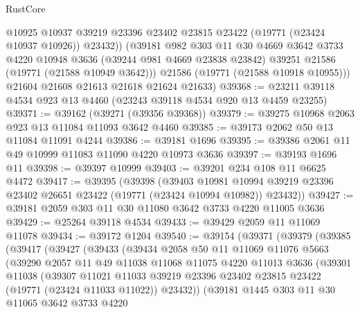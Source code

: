 \begin{lexlean}{RustCore}
\begin{coremodule}
            @10925
            @10937
            @39219
            @23396
            @23402
            @23815
            @23422
            (@19771 (@23424 @10937 @10926))
            @23432))
        (@39181
          @982
          @303
          @11
          @30
          @4669
          @3642
          @3733
          @4220
          @10948
          @3636
          (@39244 @981 @4669 @23838 @23842)
          @39251
          @21586
          (@19771 (@21588 @10949 @3642)))
        @21586
        (@19771 (@21588 @10918 @10955)))
      @21604
      @21608
      @21613
      @21618
      @21624
      @21633)
@39368 := @23211 @39118 @4534 @923 @13 @4460 (@23243 @39118 @4534 @920 @13 @4459 @23255)
@39371 := @39162 (@39271 (@39356 @39368))
@39379 := @39275 @10968 @2063 @923 @13 @11084 @11093 @3642 @4460
@39385 := @39173 @2062 @50 @13 @11084 @11091 @4244
@39386 := @39181 @1696
@39395 := @39386 @2061 @11 @49 @10999 @11083 @11090 @4220 @10973 @3636
@39397 := @39193 @1696 @11
@39398 := @39397 @10999
@39403 := @39201 @234 @108 @11 @6625 @4472
@39417 := @39395
    (@39398
      (@39403
        @10981
        @10994
        @39219
        @23396
        @23402
        @26651
        @23422
        (@19771 (@23424 @10994 @10982))
        @23432))
@39427 := @39181 @2059 @303 @11 @30 @11080 @3642 @3733 @4220 @11005 @3636
@39429 := @25264 @39118 @4534
@39433 := @39429 @2059 @11 @11069 @11078
@39434 := @39172 @1204
@39540 := @39154
    (@39371
      (@39379
        (@39385
          (@39417
            (@39427
              (@39433
                (@39434
                  @2058
                  @50
                  @11
                  @11069
                  @11076
                  @5663
                  (@39290
                    @2057
                    @11
                    @49
                    @11038
                    @11068
                    @11075
                    @4220
                    @11013
                    @3636
                    (@39301
                      @11038
                      (@39307
                        @11021
                        @11033
                        @39219
                        @23396
                        @23402
                        @23815
                        @23422
                        (@19771 (@23424 @11033 @11022))
                        @23432))
                    (@39181
                      @1445
                      @303
                      @11
                      @30
                      @11065
                      @3642
                      @3733
                      @4220

\end{coremodule}
\end{lexlean}
